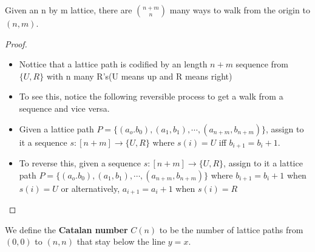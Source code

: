 \begin{theorem}
    Given an n by m lattice, there are ${n+m \choose n}$ many ways to walk from the origin to $(n,m)$.
\end{theorem}
\begin{proof}\
    \begin{itemize}
        \item Nottice that a lattice path is codified by an length $n+m$ sequence from $\{U,R\}$ with n many R's(U means up and R means right)
        \item To see this, notice the following reversible process to get a walk from a sequence and vice versa.
        \item Given a lattice path $P=\{(a_o.b_0),(a_1,b_1), \cdots ,(a_{n+m},b_{n+m})\}$, assign to it a sequence $s:[n+m] \rightarrow \{U,R\}$ where $s(i)=U$ iff $b_{i+1}=b_i+1$.
        \item To reverse this, given a sequence $s:[n+m] \rightarrow \{U,R\}$, assign to it a lattice path $P=\{(a_o.b_0),(a_1,b_1), \cdots ,(a_{n+m},b_{n+m})\}$ where $b_{i+1}=b_i+1$ when $s(i)=U$ or alternatively, $a_{i+1}=a_i+1$ when $s(i)=R$
    \end{itemize}
\end{proof}

\begin{definition}
    We define the \textbf{Catalan number} $C(n)$ to be the number of lattice paths from $(0,0)$ to $(n,n)$ that stay below the line $y=x$.
\end{definition}

